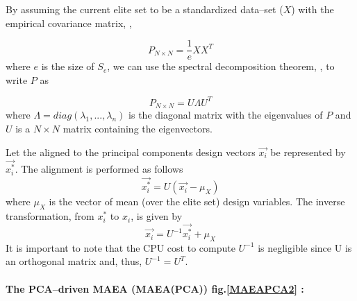 By assuming the current elite set to be a standardized data--set ($X$) with the empirical covariance matrix, \cite{Fodor_2002, Jolliffe_2002},

\begin{equation} 
   P_{N\times N}= \frac{1}{e}XX^T
   \label{Cov_Mat} 
\end{equation}
where $e$ is the size of $S_e$, we can use the spectral decomposition theorem, \cite{Axler_1997, Fodor_2002}, to write $P$ as

\begin{equation} 
   P_{N\times N}= U\Lambda U^T
   \label{spectral}
\end{equation}
where $\Lambda\!=\!diag(\lambda_1 , . . . , \lambda_n )$ is the diagonal matrix with the eigenvalues of $P$ and $U$ is a $N\!\times\!N$ matrix containing the eigenvectors.

Let the aligned to the principal components design vectors \(\overrightarrow{x_i}\) be represented by \(\overrightarrow{x^*_i}\). The alignment is performed as follows
\begin{equation} 
   \overrightarrow{x^*_i}=U(\overrightarrow{x_i}-\mu_{X})
   \label{align} %
\end{equation}
where $\mu_{X}$ is the vector of mean (over the elite set) design variables.
The inverse transformation, from $x^*_i$ to $x_i$, is given by
\begin{equation} 
   \overrightarrow{x_i}=U^{-1}\overrightarrow{x^*_i}+\mu_{X}
	\label{re-align}
\end{equation}
It is important to note that the CPU cost to compute \(U^{-1}\) is negligible since U is an orthogonal matrix and, thus, \(U^{-1} = U^T\). 
\paragraph{}
{\bf The PCA--driven MAEA (MAEA(PCA)) fig.\ref{MAEAPCA2} :}


